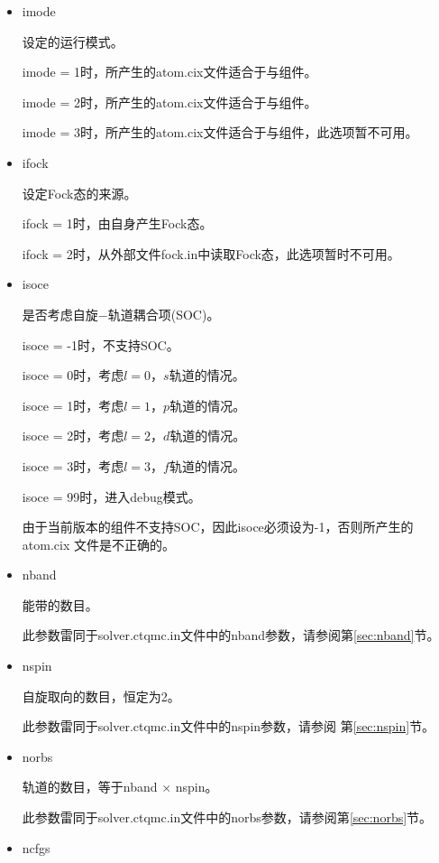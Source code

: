 \begin{itemize}
\item {\color{red}imode}

设定{\jasmine}的运行模式。

imode = 1时，所产生的atom.cix文件适合于{\begonia}与{\lavender}组件。

imode = 2时，所产生的atom.cix文件适合于{\camellia}与{\epiphyllum}组件。

imode = 3时，所产生的atom.cix文件适合于{\pansy}与{\manjushaka}组件，此选项暂不可用。

\item {\color{red}ifock}

设定Fock态的来源。

ifock = 1时，由{\jasmine}自身产生Fock态。

ifock = 2时，从外部文件fock.in中读取Fock态，此选项暂时不可用。

\item {\color{red}isoce}

是否考虑自旋$-$轨道耦合项(SOC)。

isoce = -1时，不支持SOC。

isoce = 0时，考虑$l = 0$，$s$轨道的情况。

isoce = 1时，考虑$l = 1$，$p$轨道的情况。

isoce = 2时，考虑$l = 2$，$d$轨道的情况。

isoce = 3时，考虑$l = 3$，$f$轨道的情况。

isoce = 99时，进入debug模式。

由于当前版本的{\jasmine}组件不支持SOC，因此isoce必须设为-1，否则所产生的atom.cix
文件是不正确的。

\item {\color{red}nband}

能带的数目。

此参数雷同于solver.ctqmc.in文件中的nband参数，请参阅第\ref{sec:nband}节。

\item {\color{red}nspin}

自旋取向的数目，恒定为2。

此参数雷同于solver.ctqmc.in文件中的nspin参数，请参阅
第\ref{sec:nspin}节。

\item {\color{red}norbs}

轨道的数目，等于nband $ \times $ nspin。

此参数雷同于solver.ctqmc.in文件中的norbs参数，请参阅第\ref{sec:norbs}节。

\item {\color{red}ncfgs}


\end{itemize}
